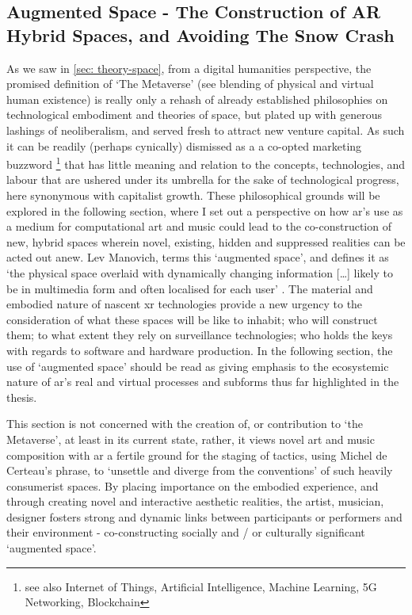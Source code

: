 \subsection[Augmented Space]{Augmented Space - The Construction of AR Hybrid Spaces, and Avoiding The Snow Crash}\label{sec: discussion-medium-space}
As we saw in \autoref{sec: theory-space}, from a digital humanities perspective, the promised definition of `The Metaverse' (see blending of physical and virtual human existence) is really only a rehash of already established philosophies on technological embodiment and theories of space, but plated up with generous lashings of neoliberalism, and served fresh to attract new venture capital. As such it can be readily (perhaps cynically) dismissed as a a co-opted marketing buzzword \footnote{see also Internet of Things, Artificial Intelligence, Machine Learning, 5G Networking, Blockchain} that has little meaning and relation to the concepts, technologies, and labour that are ushered under its umbrella for the sake of technological progress, here synonymous with capitalist growth. These philosophical grounds will be explored in the following section, where I set out a perspective on how \gls{ar}'s use as a medium for computational art and music could lead to the co-construction of new, hybrid spaces wherein novel, existing, hidden and suppressed realities can be acted out anew. Lev Manovich, terms this `augmented space', and defines it as `the physical space overlaid with dynamically changing information […] likely to be in multimedia form and often localised for each user' \citep[p. 2]{manovich2006}. The material and embodied nature of nascent \gls{xr} technologies provide a new urgency to the consideration of what these spaces will be like to inhabit; who will construct them; to what extent they rely on surveillance technologies; who holds the keys with regards to software and hardware production. In the following section, the use of `augmented space' should be read as giving emphasis to the ecosystemic nature of \gls{ar}'s real and virtual processes and subforms thus far highlighted in the thesis. 

This section is not concerned with the creation of, or contribution to `the Metaverse', at least in its current state, rather, it views novel art and music composition with \gls{ar} a fertile ground for the staging of tactics, using Michel de Certeau's phrase, to `unsettle and diverge from the conventions' \citeyearpar[p. 36]{decerteau1984} of such heavily consumerist spaces. By placing importance on the embodied experience, and through creating novel and interactive aesthetic realities, the artist, musician, designer fosters strong and dynamic links between participants or performers and their environment - co-constructing socially and / or culturally significant `augmented space'.

